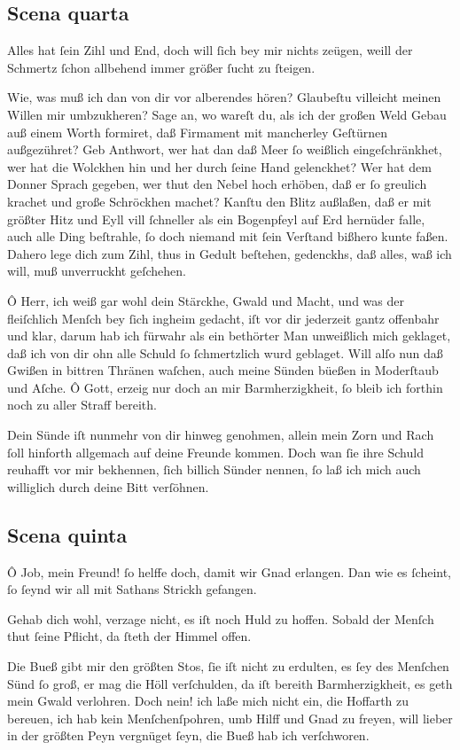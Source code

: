 \documentclass{ees}
\newenvironment{lyrics}[1]{%
  \subsection{#1}\nopagebreak%
  \begin{lyricslist}%
  \let\voice\item%
}{%
  \end{lyricslist}%
}
\begin{document}
\begin{lyrics}{Scena quarta}
  \voice[Job]
  Alles hat ſein Zihl und End,
  doch will ſich bey mir nichts zeügen,
  weill der Schmertz ſchon allbehend
  immer größer ſucht zu ſteigen.

  \voice[Schöpffer]
  Wie, was muß ich dan von dir
  vor alberendes hören?
  Glaubeſtu villeicht
  meinen Willen mir umbzukheren?
  Sage an, wo wareſt du,
  als ich der großen Weld Gebau
  auß einem Worth formiret,
  daß Firmament mit mancherley Geſtürnen außgezühret?
  Geb Anthwort, wer hat dan daß Meer
  ſo weißlich eingeſchränkhet,
  wer hat die Wolckhen hin und her
  durch ſeine Hand gelenckhet?
  Wer hat dem Donner Sprach gegeben,
  wer thut den Nebel hoch erhöben,
  daß er ſo greulich krachet
  und große Schröckhen machet?
  Kanſtu den Blitz außlaßen,
  daß er mit größter Hitz und Eyll
  vill ſchneller als ein Bogenpfeyl
  auf Erd hernüder falle,
  auch alle Ding beſtrahle,
  ſo doch niemand mit ſein Verſtand
  bißhero kunte faßen.
  Dahero lege dich zum Zihl,
  thus in Gedult beſtehen,
  gedenckhs, daß alles, waß ich will,
  muß unverruckht geſchehen.

  \voice[Job]
  Ô Herr, ich weiß gar wohl
  dein Stärckhe, Gwald und Macht,
  und was der fleiſchlich Menſch
  bey ſich ingheim gedacht,
  iſt vor dir jederzeit
  gantz offenbahr und klar,
  darum hab ich fürwahr
  als ein bethörter Man
  unweißlich mich geklaget,
  daß ich von dir ohn alle Schuld
  ſo ſchmertzlich wurd geblaget.
  Will alſo nun daß Gwißen
  in bittren Thränen waſchen,
  auch meine Sünden büeßen
  in Moderſtaub und Aſche.
  Ô Gott, erzeig
  nur doch an mir Barmherzigkheit,
  ſo bleib ich forthin noch
  zu aller Straff bereith.

  \voice[Schöpffer]
  Dein Sünde iſt nunmehr
  von dir hinweg genohmen,
  allein mein Zorn und Rach
  ſoll hinforth allgemach
  auf deine Freunde kommen.
  Doch wan ſie ihre Schuld
  reuhafft vor mir bekhennen,
  ſich billich Sünder nennen,
  ſo laß ich mich
  auch williglich
  durch deine Bitt verſöhnen.
\end{lyrics}

\begin{lyrics}{Scena quinta}
  \voice[Eliphas]
  Ô Job, mein Freund! ſo helffe doch,
  damit wir Gnad erlangen.
  Dan wie es ſcheint, ſo ſeynd wir all
  mit Sathans Strickh gefangen.

  \voice[Job]
  Gehab dich wohl, verzage nicht,
  es iſt noch Huld zu hoffen.
  Sobald der Menſch thut ſeine Pflicht,
  da ſteth der Himmel offen.

  \voice[Leviathan]
  Die Bueß gibt mir den größten Stos,
  ſie iſt nicht zu erdulten,
  es ſey des Menſchen Sünd ſo groß,
  er mag die Höll verſchulden,
  da iſt bereith Barmherzigkheit,
  es geth mein Gwald verlohren.
  Doch nein!
  ich laße mich nicht ein,
  die Hoffarth zu bereuen,
  ich hab kein Menſchenſpohren,
  umb Hilff und Gnad zu freyen,
  will lieber in der größten Peyn
  vergnüget ſeyn,
  die Bueß hab ich verſchworen.
\end{lyrics}
\end{document}
